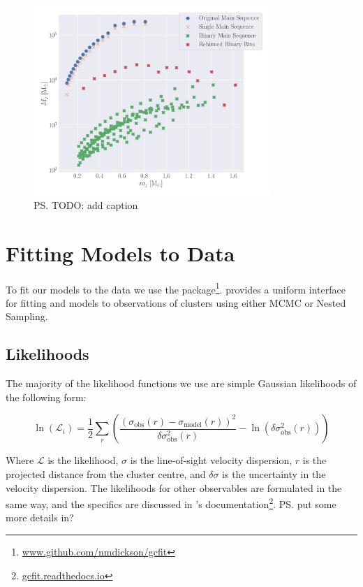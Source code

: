 \begin{figure}
	\centering
	\includegraphics[width=0.8\textwidth]{figures/shifted-mf.png}
	\caption{\ps{TODO: add caption}}
	\label{fig:2/shifted-mf}
\end{figure}



\section{Fitting Models to Data}


To fit our models to the data we use the 
package\footnote{\url{www.github.com/nmdickson/gcfit}}.  provides a uniform interface for
fitting \evolvemf{} and  models to observations of clusters using either MCMC or Nested
Sampling.

\subsection{Likelihoods}

The majority of the likelihood functions we use are simple Gaussian likelihoods of the following form:

\begin{equation}
	\ln \left(\mathcal{L}_{i}\right)=\frac{1}{2}
	\sum_{r}\left(\frac{\left(\sigma_{\mathrm{obs}}(r)
		-\sigma_{\mathrm{model}}(r)\right)^{2}}{\delta \sigma_{\mathrm{obs}}^{2}(r)}
	-\ln \left(\delta \sigma_{\mathrm{obs}}^{2}(r)\right)\right)
\end{equation}

Where $\mathcal{L}$ is the likelihood, $\sigma$ is the line-of-sight velocity dispersion, $r$ is the
projected distance from the cluster centre, and $\delta \sigma$ is the uncertainty in the velocity
dispersion. The likelihoods for other observables are formulated in the same way, and the specifics
are discussed in 's documentation\footnote{\url{gcfit.readthedocs.io}}.
\ps{put some more details in?}




